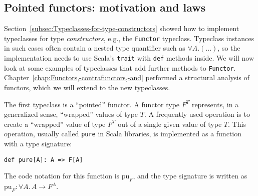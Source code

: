 \subsection{Pointed functors: motivation and laws\label{subsec:Pointed-functors-motivation-equivalence}}

Section~\ref{subsec:Typeclasses-for-type-constructors} showed how
to implement typeclasses for type \emph{constructors}, e.g., the \lstinline!Functor!
typeclass. Typeclass instances in such cases often contain a nested
type quantifier such as $\forall A.\left(...\right)$, so the implementation
needs to use Scala\textsf{'}s \lstinline!trait! with \lstinline!def! methods
inside. We will now look at some examples of typeclasses that add
further methods to \lstinline!Functor!. Chapter~\ref{chap:Functors,-contrafunctors,-and}
performed a structural analysis of functors, which we will extend
to the new typeclasses.

The first typeclass is a \textsf{``}pointed\textsf{''} functor. A functor type $F^{T}$
represents, in a generalized sense, \textsf{``}wrapped\textsf{''} values of type $T$.
A frequently used operation is to create a \textsf{``}wrapped\textsf{''} value of
type $F^{T}$ out of a single given value of type $T$. This operation,
usually called \lstinline!pure! in Scala libraries, is implemented
as a function with a type signature:
\begin{lstlisting}
def pure[A]: A => F[A]
\end{lstlisting}
The code notation for this function is $\text{pu}_{F}$, and the type
signature is written as $\text{pu}_{F}:\forall A.\,A\rightarrow F^{A}$. 

